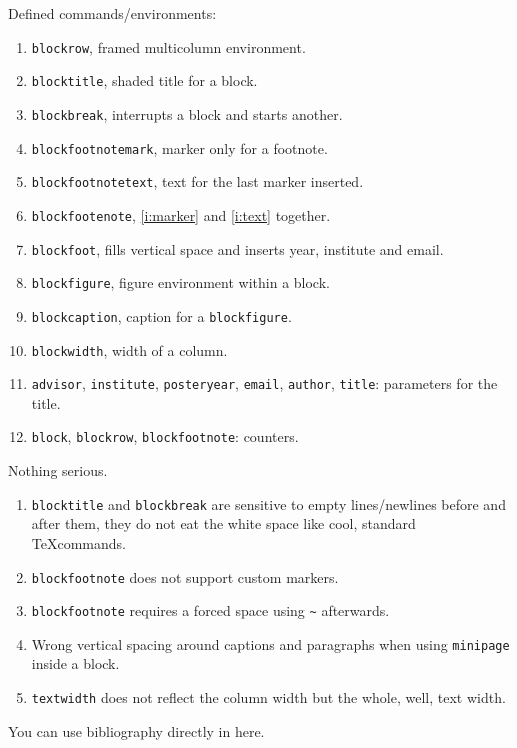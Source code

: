 \documentclass[a3paper]{bigsposter}
\newcommand{\emptybox}[2]{\framebox[#1]{\rule{0pt}{#2}}}
\begin{document}
  \begin{blockrow}[3]
    Defined commands/environments:
    \begin{enumerate}
      \item \texttt{blockrow}, framed multicolumn environment.
      \item \texttt{blocktitle}, shaded title for a block.
      \item \texttt{blockbreak}, interrupts a block and starts another.
      \item \texttt{blockfootnotemark}, marker only for a footnote. \label{i:marker}
      \item \texttt{blockfootnotetext}, text for the last marker inserted. \label{i:text}
      \item \texttt{blockfootenote}, \ref{i:marker} and \ref{i:text} together.
      \item \texttt{blockfoot}, fills vertical space and inserts year, institute and email.
      \item \texttt{blockfigure}, figure environment within a block.
      \item \texttt{blockcaption}, caption for a \texttt{blockfigure}.
      \item \texttt{blockwidth}, width of a column.
      \item \texttt{advisor}, \texttt{institute}, \texttt{posteryear}, \texttt{email}, \texttt{author}, \texttt{title}: parameters for the title.
      \item \texttt{block}, \texttt{blockrow}, \texttt{blockfootnote}: counters.
    \end{enumerate}
  \blockbreak
    \textcolor{lightgray}{\lipsum[4]}
    Nothing serious.
    \begin{enumerate}
      \item \texttt{blocktitle} and \texttt{blockbreak} are sensitive to empty lines/newlines before and after them, they do not eat the white space like cool, standard \TeX commands.
      \item \texttt{blockfootnote} does not support custom markers.
      \item \texttt{blockfootnote} requires a forced space using \texttt{\textasciitilde} afterwards.
      \item Wrong vertical spacing around captions and paragraphs when using \texttt{minipage} inside a block.
      \item \texttt{textwidth} does not reflect the column width but the whole, well, text width.
    \end{enumerate}
  \blockbreak
    \begin{blockfigure}
      \emptybox{0.8\blockwidth}{5em}
    \end{blockfigure}
    \textcolor{lightgray}{\lipsum[6]}
    You can use bibliography directly in here.
    \nocite{*}
    
    \blockfoot
  \end{blockrow}
\end{document}
